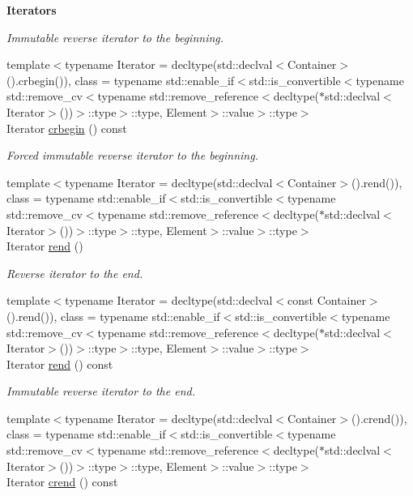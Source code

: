 \begin{Indent}{\bf Iterators}
\begin{DoxyCompactItemize}
\begin{DoxyCompactList}\small\item\em Immutable reverse iterator to the beginning. \end{DoxyCompactList}\item 
{\footnotesize template$<$typename Iterator  = decltype(std\-::declval$<$\-Container$>$().\-crbegin()), class  = typename std\-::enable\-\_\-if$<$std\-::is\-\_\-convertible$<$typename std\-::remove\-\_\-cv$<$typename std\-::remove\-\_\-reference$<$decltype($\ast$std\-::declval$<$\-Iterator$>$())$>$\-::type$>$\-::type, Element$>$\-::value$>$\-::type$>$ }\\Iterator \hyperlink{exceptionmagrathea_1_1SimpleHyperOctree_a958b80e21c579f61f842b23ee7a89490}{crbegin} () const 
\begin{DoxyCompactList}\small\item\em Forced immutable reverse iterator to the beginning. \end{DoxyCompactList}\item 
{\footnotesize template$<$typename Iterator  = decltype(std\-::declval$<$\-Container$>$().\-rend()), class  = typename std\-::enable\-\_\-if$<$std\-::is\-\_\-convertible$<$typename std\-::remove\-\_\-cv$<$typename std\-::remove\-\_\-reference$<$decltype($\ast$std\-::declval$<$\-Iterator$>$())$>$\-::type$>$\-::type, Element$>$\-::value$>$\-::type$>$ }\\Iterator \hyperlink{exceptionmagrathea_1_1SimpleHyperOctree_a6688705a3251d03ceedb097b116b1a59}{rend} ()
\begin{DoxyCompactList}\small\item\em Reverse iterator to the end. \end{DoxyCompactList}\item 
{\footnotesize template$<$typename Iterator  = decltype(std\-::declval$<$const Container$>$().\-rend()), class  = typename std\-::enable\-\_\-if$<$std\-::is\-\_\-convertible$<$typename std\-::remove\-\_\-cv$<$typename std\-::remove\-\_\-reference$<$decltype($\ast$std\-::declval$<$\-Iterator$>$())$>$\-::type$>$\-::type, Element$>$\-::value$>$\-::type$>$ }\\Iterator \hyperlink{exceptionmagrathea_1_1SimpleHyperOctree_abeb390e318ab59068a574c25ea015ed9}{rend} () const 
\begin{DoxyCompactList}\small\item\em Immutable reverse iterator to the end. \end{DoxyCompactList}\item 
{\footnotesize template$<$typename Iterator  = decltype(std\-::declval$<$\-Container$>$().\-crend()), class  = typename std\-::enable\-\_\-if$<$std\-::is\-\_\-convertible$<$typename std\-::remove\-\_\-cv$<$typename std\-::remove\-\_\-reference$<$decltype($\ast$std\-::declval$<$\-Iterator$>$())$>$\-::type$>$\-::type, Element$>$\-::value$>$\-::type$>$ }\\Iterator \hyperlink{exceptionmagrathea_1_1SimpleHyperOctree_a921c050126acad7787be98732772e188}{crend} () const 

\end{DoxyCompactItemize}
\end{Indent}
